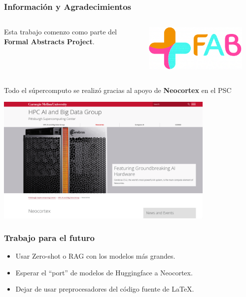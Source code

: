 \documentclass[10pt]{beamer}
\begin{document}
\begin{frame}
    \frametitle{Información y Agradecimientos}
    \begin{columns}
        \begin{column}{0.6\textwidth}
            Esta trabajo comenzo como parte del \textbf{Formal Abstracts Project}.
        \end{column}
        \begin{column}{0.4\textwidth}
            \begin{center}
                \includegraphics[width=0.9\textwidth]{../Images/fabstracts2.png}
            \end{center}
        \end{column}
    \end{columns}
        \pause
        Todo el súpercomputo se realizó gracias al apoyo de \textbf{Neocortex} en el PSC 
            \begin{center}
                \includegraphics[width=0.8\textwidth]{../Images/neocortex_pic.png}
            \end{center}
\end{frame}

\begin{frame}
    \frametitle{Trabajo para el futuro}
    \begin{itemize}
        \item Usar Zero-shot o RAG con los modelos más grandes.
            \pause
        \item Esperar el ``port'' de modelos de Huggingface a Neocortex.
            \pause
        \item Dejar de usar preprocesadores del código fuente de \LaTeX{}.
    \end{itemize}
\end{frame}

\begin{frame}
\titlepage
\end{frame}
\end{document}

